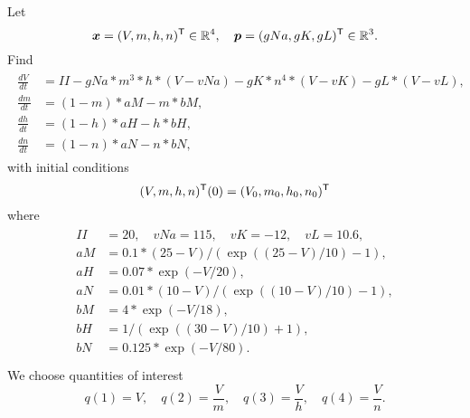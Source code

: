 \documentclass{siamltex}
\newcommand{\pvec}{\bm{p}}
\newcommand{\xvec}{\bm{x}}
\newcommand{\reals}{\mathbb R}
\begin{document}
Let
\begin{equation}
\xvec=(V,m,h,n)^{\sf T} \in \reals^4, \quad \pvec=(gNa,gK,gL)^{\sf T}\in\reals^3.
\end{equation}
Find
\begin{equation}
\begin{gathered}\begin{aligned}
\frac{dV}{dt} &= II - gNa* m^3* h* (V-vNa) - gK* n^4* (V-vK) - gL* (V-vL), \\
\frac{dm}{dt} &= (1-m)* aM - m* bM,  \\
\frac{dh}{dt} &= (1-h)* aH - h* bH, \\
\frac{dn}{dt} &= (1-n)* aN - n* bN,
\end{aligned}\end{gathered}
\end{equation}
with initial conditions
\begin{equation}
(V,m,h,n)^{\sf T}(0) = (V_0,m_0,h_0,n_0)^{\sf T}
\end{equation}
where
\begin{equation}
\begin{gathered}\begin{aligned}
II &= 20, \quad vNa = 115, \quad vK = -12, \quad vL = 10.6, \\
aM &= 0.1*(25-V)/(\exp((25-V)/10)-1), \\
aH &= 0.07*\exp(-V/20), \\
aN &= 0.01*(10-V)/(\exp((10-V)/10)-1), \\
bM &= 4*\exp(-V/18), \\
bH &= 1/(\exp((30-V)/10)+1), \\
bN &= 0.125*\exp(-V/80). \\
\end{aligned}\end{gathered}
\end{equation}
We choose quantities of interest
\begin{equation}
q(1)= V, \quad q(2)= \frac{V}{m}, \quad q(3)= \frac{V}{h}, \quad q(4)= \frac{V}{n}.
\end{equation}




\end{document}
